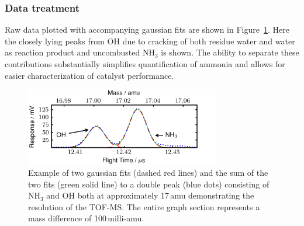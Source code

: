 \documentclass[aip,rsi]{revtex4-1}
\begin{document}
\subsubsection{Data treatment}
Raw data plotted with accompanying gaussian fits are shown in Figure~\ref{fig:gaussian_fit}. Here the closely lying peaks from OH due to cracking of both residue water and water as reaction product and uncombusted NH$_3$ is shown. The ability to separate these contributions substantially simplifies quantification of ammonia and allows for easier characterization of catalyst performance. 
\begin{figure}
 \includegraphics[width=8.5cm]{ammonia_OH_gauss_fit.png}%
 \caption{Example of two gaussian fits (dashed red lines) and the sum of the two fits (green solid line) to a double peak (blue dots) consisting of NH$_{3}$ and OH both at approximately 17\,amu demonstrating the resolution of the TOF-MS. The entire graph section represents a mass difference of 100\,milli-amu.\label{fig:gaussian_fit}}%
\end{figure}
\end{document}

